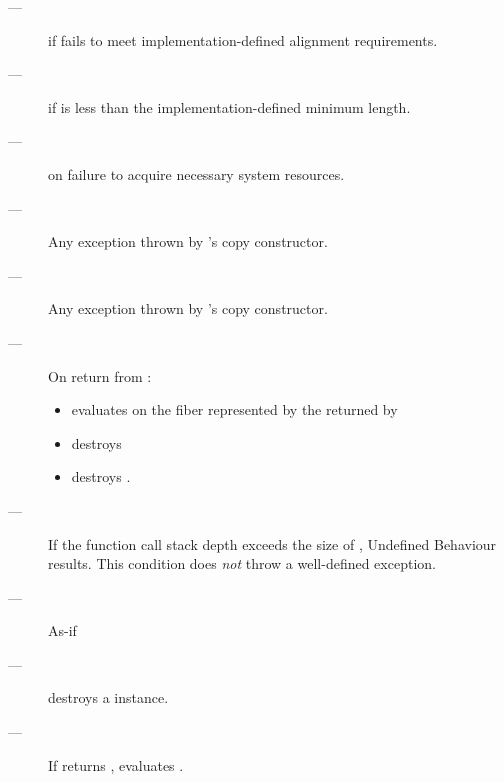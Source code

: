 \except
\begin{description}
    \item[---]  if  fails to meet
               implementation-defined alignment requirements.
    \item[---]  if  is less than the
               implementation-defined minimum length.
    \item[---]  on failure to acquire necessary system
               resources.
    \item[---] Any exception thrown by 's copy constructor.
    \item[---] Any exception thrown by 's copy constructor.
\end{description}

\remarks
\begin{description}
    \item[---] On return from :
        \begin{itemize}
            \item evaluates  on the fiber
                  represented by the  returned by 
            \item destroys 
            \item destroys .
        \end{itemize}
    \item[---] If the function call stack depth exceeds the size
               of , Undefined Behaviour results. This condition
               does \emph{not} throw a well-defined exception.
\end{description}


\effects
\begin{description}
    \item[---] As-if 
\end{description}


\effects
\begin{description}
    \item[---] destroys a \fiber instance.
\end{description}

\effects
\begin{description}
    \item[---] If  returns , evaluates .
\end{description}

